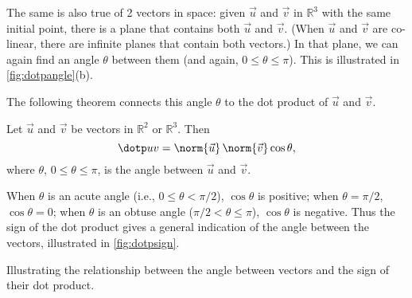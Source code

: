 The same is also true of 2 vectors in space: given $\vec u$ and $\vec v$ in $\mathbb{R}^3$ with the same initial point, there is a plane that contains both $\vec u$ and $\vec v$. (When $\vec u$ and $\vec v$ are co-linear, there are infinite planes that contain both vectors.) In that plane, we can again find an angle $\theta$ between them (and again, $0\leq \theta\leq \pi$). This is illustrated in \autoref{fig:dotpangle}(b).

The following theorem connects this angle $\theta$ to the dot product of $\vec u$ and $\vec v$.

\begin{theorem}\label{thm:dot_product}
Let $\vec u$ and $\vec v$ be vectors in $\mathbb{R}^2$ or $\mathbb{R}^3$. Then 
\[\dotp uv = \norm{\vec u}\,\norm{\vec v} \cos\theta,\]
where $\theta$, $0\leq\theta\leq \pi$, is the angle between $\vec u$ and $\vec v$.
\end{theorem}

When $\theta$ is an acute angle (i.e., $0\leq \theta <\pi/2$), $\cos \theta$ is positive; when $\theta = \pi/2$, $\cos \theta = 0$; when $\theta$ is an obtuse angle ($\pi/2<\theta \leq \pi$), $\cos \theta$ is negative. Thus the sign of the dot product gives a general indication of the angle between the vectors, illustrated in \autoref{fig:dotpsign}.

\noindent\begin{minipage}[t]{\linewidth}\noindent%
\captionsetup{type=figure}%
\centering
{}
\caption{Illustrating the relationship between the angle between vectors and the sign of their dot product.}
\label{fig:dotpsign}
\end{minipage}

